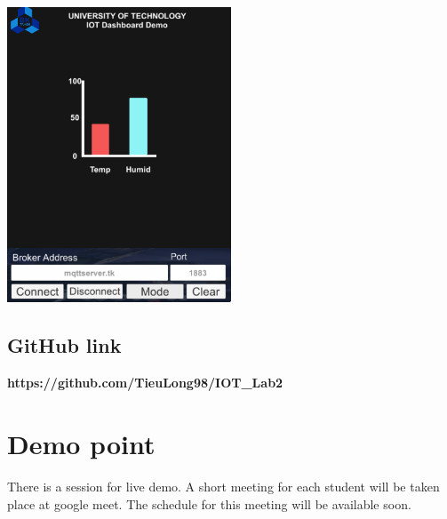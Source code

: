 \documentclass[a4paper,11pt]{article}
\theoremstyle{mytheor}
\begin{document}
\begin{center}
    \includegraphics[width=0.5\textwidth]{Scene3.png}\\
\end{center}

\subsection{GitHub link}

\begin{center}
    \textbf{https://github.com/TieuLong98/IOT\_Lab2}
\end{center}
\section{Demo point}
There is a session for live demo. A short meeting for each student will be taken place at google
meet. The schedule for this meeting will be available soon.
\end{document}
